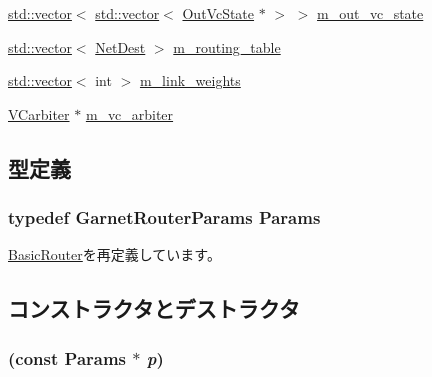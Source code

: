 \begin{DoxyCompactItemize}
\item 
\hyperlink{classstd_1_1vector}{std::vector}$<$ \hyperlink{classstd_1_1vector}{std::vector}$<$ \hyperlink{classOutVcState}{OutVcState} $\ast$ $>$ $>$ \hyperlink{classRouter_ac42fe6cf02410262c5525a2abcc921b6}{m\_\-out\_\-vc\_\-state}
\item 
\hyperlink{classstd_1_1vector}{std::vector}$<$ \hyperlink{classNetDest}{NetDest} $>$ \hyperlink{classRouter_adce3e392ac98699a80750fa4a4aa9b40}{m\_\-routing\_\-table}
\item 
\hyperlink{classstd_1_1vector}{std::vector}$<$ int $>$ \hyperlink{classRouter_a0894e57ab5d2ddc0e8c5d60a53a27cff}{m\_\-link\_\-weights}
\item 
\hyperlink{classVCarbiter}{VCarbiter} $\ast$ \hyperlink{classRouter_a03eb166814fcfceb112402a09259cae7}{m\_\-vc\_\-arbiter}
\end{DoxyCompactItemize}


\subsection{型定義}
\hypertarget{classRouter_aefbd30db7d0c203dbe4553fdfe3c2b0e}{
\subsubsection[{Params}]{\setlength{\rightskip}{0pt plus 5cm}typedef GarnetRouterParams {\bf Params}}}
\label{classRouter_aefbd30db7d0c203dbe4553fdfe3c2b0e}


\hyperlink{classBasicRouter_af2c419269bc768b96a7bae9bfbcd3e94}{BasicRouter}を再定義しています。

\subsection{コンストラクタとデストラクタ}
\hypertarget{classRouter_a08e8916427569b37de6a373acb130e0d}{
\subsubsection[{Router}]{ (const {\bf Params} $\ast$ {\em p})}}
\label{classRouter_a08e8916427569b37de6a373acb130e0d}



